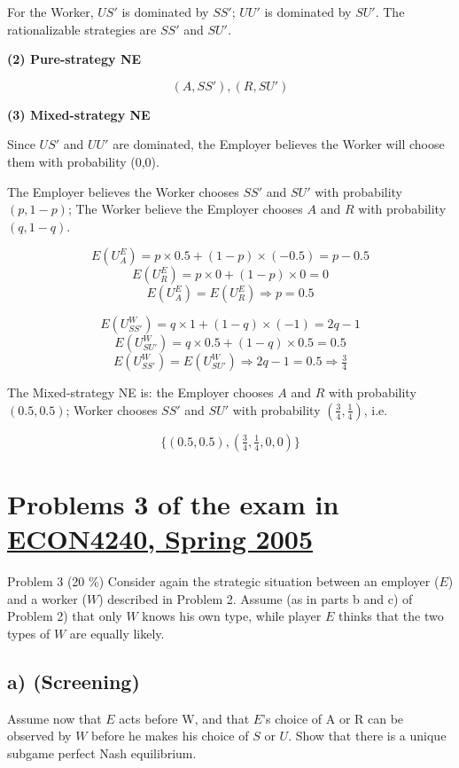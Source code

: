 \documentclass{article}
\begin{document}
For the Worker, $US'$ is dominated by $SS'$; $UU'$ is dominated by $SU'$. The rationalizable strategies are $SS'$ and $SU'$.

\medskip

\textbf{(2) Pure-strategy NE}

$$(A,SS'),(R,SU')$$

\smallskip

\textbf{(3) Mixed-strategy NE}

\medskip

Since $US'$ and $UU'$ are dominated, the Employer believes the Worker will choose 
them with probability (0,0).

\medskip

The Employer believes the Worker chooses $SS'$ and $SU'$ with probability $(p,1-p)$;
The Worker believe the Employer chooses $A$ and $R$ with probability $(q,1-q)$.

$$E(U^E_A) = p \times 0.5 + (1-p) \times (-0.5) = p-0.5$$
$$E(U^E_R) = p \times 0 + (1-p) \times 0 = 0$$
$$E(U^E_A) = E(U^E_R) \Rightarrow p=0.5$$


$$E(U^W_{SS'}) = q \times 1 + (1-q) \times (-1) = 2q-1$$
$$E(U^W_{SU'}) = q \times 0.5 + (1-q) \times 0.5 = 0.5$$
$$E(U^W_{SS'}) = E(U^W_{SU'}) \Rightarrow 2q-1=0.5 \Rightarrow \tfrac34$$

The Mixed-strategy NE is: the Employer chooses $A$ and $R$ with probability $(0.5,0.5)$; Worker chooses $SS'$ and $SU'$ with probability $(\tfrac34,\tfrac14)$, i.e.

$$\{(0.5,0.5), (\tfrac34,\tfrac14,0,0)\}$$


\section{Problems 3  of the exam in \href{https://www.uio.no/studier/emner/sv/oekonomi/ECON4240/previous-exams/}{ECON4240, Spring 2005}}

Problem 3 (20 \%)
Consider again the strategic situation between an employer ($E$) and a worker ($W$) described in
Problem 2. Assume (as in parts b and c) of Problem 2) that only $W$ knows his own type, while
player $E$ thinks that the two types of $W$ are equally likely.

\subsection*{a) (Screening)} Assume now that $E$ acts before W, and that $E$'s choice of A or R can be
observed by $W$ before he makes his choice of $S$ or $U$. Show that there is a unique
subgame perfect Nash equilibrium.
\end{document}
